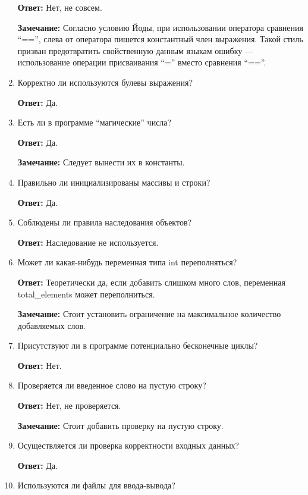 \documentclass[11pt,a4paper,final]{article} %
\begin{document}
\begin{enumerate}
	\textbf{Ответ:} Нет, не совсем. 
	
	\textbf{Замечание:}	Согласно условию Йоды, при использовании оператора сравнения ``=='', слева от оператора пишется константный член выражения. Такой стиль призван предотвратить свойственную данным языкам ошибку — использование операции присваивания ``='' вместо сравнения ``==''.
	
	\item Корректно ли используются булевы выражения? 
	
	\textbf{Ответ:} Да.
	
	\item Есть ли в программе ``магические'' числа?
	
	\textbf{Ответ:} Да.
	
	\textbf{Замечание:} Следует вынести их в константы.
	
	\item Правильно ли инициализированы массивы и строки?
	
	\textbf{Ответ:} Да.
	
	\item Соблюдены ли правила наследования объектов?
	
	\textbf{Ответ:} Наследование не используется.
	
	\item Может ли какая-нибудь переменная типа int переполняться?
	
	\textbf{Ответ:} Теоретически да, если добавить слишком много слов, переменная total\_elements может переполниться.
	
	\textbf{Замечание:} Стоит установить ограничение на максимальное количество добавляемых слов.
	
	\item  Присутствуют ли в программе потенциально бесконечные циклы?
	
	\textbf{Ответ:} Нет.
 
 	\item Проверяется ли введенное слово на пустую строку? 
 
	\textbf{Ответ:} Нет, не проверяется.

	\textbf{Замечание:} Стоит добавить проверку на пустую строку.
	
	\item Осуществляется ли проверка корректности входных данных? 
	
	\textbf{Ответ:} Да.
	
	\item Используются ли файлы для ввода-вывода?
	

\end{enumerate}
\end{document}
